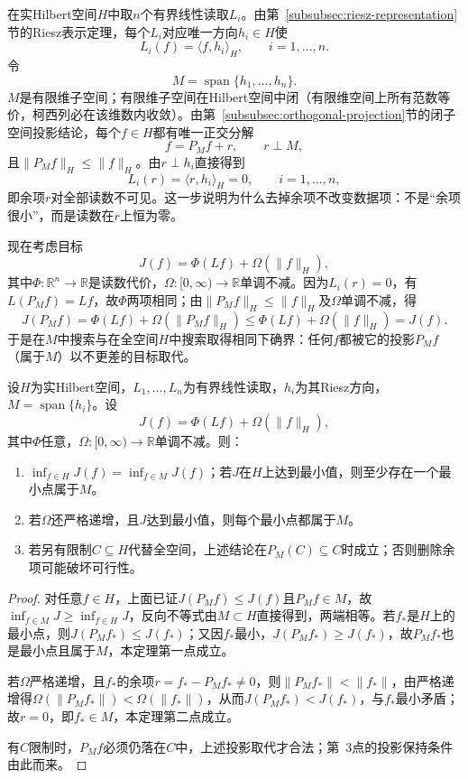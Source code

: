 在实Hilbert空间$H$中取$n$个有界线性读取$L_i$。由第~\ref{subsubsec:riesz-representation}节的Riesz表示定理，每个$L_i$对应唯一方向$h_i\in H$使
\[
  L_i(f)=\langle f,h_i\rangle_H,\qquad i=1,\ldots,n.
\]
令
\[
  M=\operatorname{span}\{h_1,\ldots,h_n\}.
\]
$M$是有限维子空间；有限维子空间在Hilbert空间中闭（有限维空间上所有范数等价，柯西列必在该维数内收敛）。由第~\ref{subsubsec:orthogonal-projection}节的闭子空间投影结论，每个$f\in H$都有唯一正交分解
\[
  f=P_Mf+r,\qquad r\perp M,
\]
且$\|P_Mf\|_H\le\|f\|_H$。由$r\perp h_i$直接得到
\[
  L_i(r)=\langle r,h_i\rangle_H=0,\qquad i=1,\ldots,n,
\]
即余项$r$对全部读数不可见。这一步说明为什么去掉余项不改变数据项：不是“余项很小”，而是读数在$r$上恒为零。

现在考虑目标
\[
  J(f)=\Phi(Lf)+\Omega(\|f\|_H),
\]
其中$\Phi:\mathbb R^n\to\mathbb R$是读数代价，$\Omega:[0,\infty)\to\mathbb R$单调不减。因为$L_i(r)=0$，有$L(P_Mf)=Lf$，故$\Phi$两项相同；由$\|P_Mf\|_H\le\|f\|_H$及$\Omega$单调不减，得
\[
  J(P_Mf)=\Phi(Lf)+\Omega(\|P_Mf\|_H)
  \le\Phi(Lf)+\Omega(\|f\|_H)=J(f).
\]
于是在$M$中搜索与在全空间$H$中搜索取得相同下确界：任何$f$都被它的投影$P_Mf$（属于$M$）以不更差的目标取代。

\begin{theorem}[有限读取下的表示定理]\label{thm:functional-representer}
设$H$为实Hilbert空间，$L_1,\ldots,L_n$为有界线性读取，$h_i$为其Riesz方向，$M=\operatorname{span}\{h_i\}$。设
\[
  J(f)=\Phi(Lf)+\Omega(\|f\|_H),
\]
其中$\Phi$任意，$\Omega:[0,\infty)\to\mathbb R$单调不减。则：
\begin{enumerate}
  \item $\inf_{f\in H}J(f)=\inf_{f\in M}J(f)$；若$J$在$H$上达到最小值，则至少存在一个最小点属于$M$。
  \item 若$\Omega$还严格递增，且$J$达到最小值，则每个最小点都属于$M$。
  \item 若另有限制$C\subseteq H$代替全空间，上述结论在$P_M(C)\subseteq C$时成立；否则删除余项可能破坏可行性。
\end{enumerate}
\end{theorem}

\begin{proof}
对任意$f\in H$，上面已证$J(P_Mf)\le J(f)$且$P_Mf\in M$，故$\inf_{f\in M}J\ge\inf_{f\in H}J$，反向不等式由$M\subset H$直接得到，两端相等。若$f_*$是$H$上的最小点，则$J(P_Mf_*)\le J(f_*)$；又因$f_*$最小，$J(P_Mf_*)\ge J(f_*)$，故$P_Mf_*$也是最小点且属于$M$，本定理第一点成立。

若$\Omega$严格递增，且$f_*$的余项$r=f_*-P_Mf_*\ne0$，则$\|P_Mf_*\|<\|f_*\|$，由严格递增得$\Omega(\|P_Mf_*\|)<\Omega(\|f_*\|)$，从而$J(P_Mf_*)<J(f_*)$，与$f_*$最小矛盾；故$r=0$，即$f_*\in M$，本定理第二点成立。

有$C$限制时，$P_Mf$必须仍落在$C$中，上述投影取代才合法；第~3点的投影保持条件由此而来。
\end{proof}

